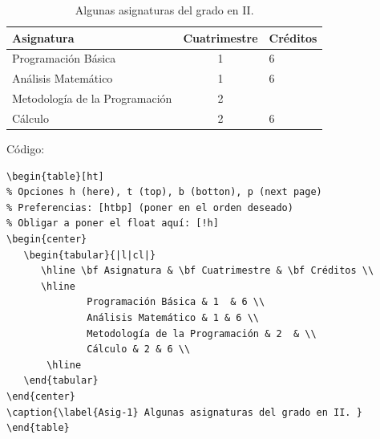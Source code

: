 \begin{table}[ht]
\begin{center}
   \begin{tabular}{|l|cl|}
      \hline \bf Asignatura & \bf Cuatrimestre & \bf Créditos \\ \hline
              Programación Básica & 1  & 6 \\
              Análisis Matemático & 1 & 6 \\
              Metodología de la Programación & 2  & \\
              Cálculo & 2 & 6 \\
       \hline
   \end{tabular}
\end{center}
\caption{\label{Asig-1} Algunas asignaturas del grado en II. }
\end{table}

\vspace{4 cm}

Código:

\vspace{0.5 cm}

\begin{minipage}{8cm}
\begin{verbatim}
\begin{table}[ht]
% Opciones h (here), t (top), b (botton), p (next page)
% Preferencias: [htbp] (poner en el orden deseado)
% Obligar a poner el float aquí: [!h] 
\begin{center}
   \begin{tabular}{|l|cl|}
      \hline \bf Asignatura & \bf Cuatrimestre & \bf Créditos \\ 
      \hline
              Programación Básica & 1  & 6 \\
              Análisis Matemático & 1 & 6 \\
              Metodología de la Programación & 2  & \\
              Cálculo & 2 & 6 \\
       \hline
   \end{tabular}
\end{center}
\caption{\label{Asig-1} Algunas asignaturas del grado en II. }
\end{table}
\end{verbatim}
\end{minipage}

\vspace{0.5 cm}

